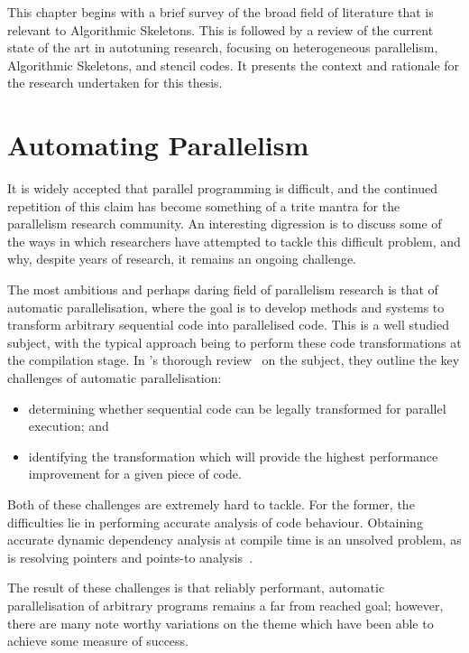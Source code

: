 This chapter begins with a brief survey of the broad field of
literature that is relevant to Algorithmic Skeletons. This is followed
by a review of the current state of the art in autotuning research,
focusing on heterogeneous parallelism, Algorithmic Skeletons, and
stencil codes. It presents the context and rationale for the research
undertaken for this thesis.


\section{Automating Parallelism}

It is widely accepted that parallel programming is difficult, and the
continued repetition of this claim has become something of a trite
mantra for the parallelism research community. An interesting
digression is to discuss some of the ways in which researchers have
attempted to tackle this difficult problem, and why, despite years of
research, it remains an ongoing challenge.

The most ambitious and perhaps daring field of parallelism research is
that of automatic parallelisation, where the goal is to develop
methods and systems to transform arbitrary sequential code into
parallelised code. This is a well studied subject, with the typical
approach being to perform these code transformations at the
compilation stage. In \citeauthor{Banerjee1993}'s thorough
review~\cite{Banerjee1993} on the subject, they outline the key
challenges of automatic parallelisation:
%
\begin{itemize}
\item determining whether sequential code can be legally transformed
  for parallel execution; and
\item identifying the transformation which will provide the highest
  performance improvement for a given piece of code.
\end{itemize}
%
Both of these challenges are extremely hard to tackle. For the former,
the difficulties lie in performing accurate analysis of code
behaviour. Obtaining accurate dynamic dependency analysis at compile
time is an unsolved problem, as is resolving pointers and points-to
analysis~\cite{Atkin-granville2013, Hind2001,Ghiya2001}.

The result of these challenges is that reliably performant, automatic
parallelisation of arbitrary programs remains a far from reached goal;
however, there are many note worthy variations on the theme which have
been able to achieve some measure of success.

